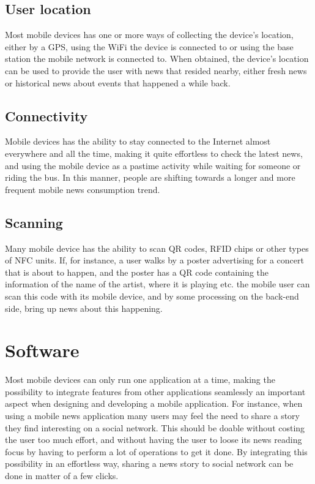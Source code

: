 \subsection{User location}
Most mobile devices has one or more ways of collecting the device's location, either by a GPS, using the WiFi the device is connected to or using the base station the mobile network is connected to. When obtained, the device's location can be used to provide the user with news that resided nearby, either fresh news or historical news about events that happened a while back.

\subsection{Connectivity}
Mobile devices has the ability to stay connected to the Internet almost everywhere and all the time, making it quite effortless to check the latest news, and using the mobile device as a pastime activity while waiting for someone or riding the bus. In this manner, people are shifting towards a longer and more frequent mobile news consumption trend\cite{stateofthemedia2012}.

\subsection{Scanning}
Many mobile device has the ability to scan QR codes, RFID chips or other types of NFC units. If, for instance, a user walks by a poster advertising for a concert that is about to happen, and the poster has a QR code containing the information of the name of the artist, where it is playing etc. the mobile user can scan this code with its mobile device, and by some processing on the back-end side, bring up news about this happening.

\section{Software}
Most mobile devices can only run one application at a time, making the possibility to integrate features from other applications seamlessly an important aspect when designing and developing a mobile application. For instance, when using a mobile news application many users may feel the need to share a story they find interesting on a social network. This should be doable without costing the user too much effort, and without having the user to loose its news reading focus by having to perform a lot of operations to get it done. By integrating this possibility in an effortless way, sharing a news story to social network can be done in matter of a few clicks. 

